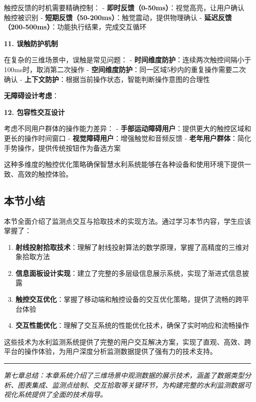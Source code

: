 触控反馈的时机需要精确控制： - \textbf{即时反馈（0-50ms）}：视觉高亮，让用户确认触控被识别 - \textbf{短期反馈（50-200ms）}：触觉震动，提供物理确认 - \textbf{延迟反馈（200-500ms）}：功能执行结果，完成交互循环

\textbf{11. 误触防护机制}

在复杂的三维场景中，误触是常见问题： - \textbf{时间维度防护}：连续两次触控间隔小于100ms时，取消第二次操作 - \textbf{空间维度防护}：同一区域5秒内的重复操作需要二次确认 - \textbf{上下文防护}：根据当前操作状态，智能判断操作意图的合理性

\textbf{无障碍设计考虑}：

\textbf{12. 包容性交互设计}

考虑不同用户群体的操作能力差异： - \textbf{手部运动障碍用户}：提供更大的触控区域和更长的操作时间窗口 - \textbf{视觉障碍用户}：增强触觉和音频反馈 - \textbf{老年用户群体}：简化手势操作，提供传统按钮作为备选方案

这种多维度的触控优化策略确保智慧水利系统能够在各种设备和使用环境下提供一致、高效的触控体验。

\subsection{本节小结}\label{ux672cux8282ux5c0fux7ed3-3}

本节全面介绍了监测点交互与拾取技术的实现方法。通过学习本节内容，学生应该掌握了：

\begin{enumerate}
\def\labelenumi{\arabic{enumi}.}
\tightlist
\item
  \textbf{射线投射拾取技术}：理解了射线投射算法的数学原理，掌握了高精度的三维对象拾取方法
\item
  \textbf{信息面板设计实现}：建立了完整的多层级信息展示系统，实现了渐进式信息披露
\item
  \textbf{触控交互优化}：掌握了移动端和触控设备的交互优化策略，提供了流畅的跨平台体验
\item
  \textbf{交互性能优化}：理解了交互系统的性能优化技术，确保了实时响应和流畅操作
\end{enumerate}

这些技术为水利监测系统提供了完整的用户交互解决方案，实现了直观、高效、跨平台的操作体验，为用户深度分析监测数据提供了强有力的技术支持。

\begin{center}\rule{0.5\linewidth}{0.5pt}\end{center}

\emph{第七章总结：本章系统介绍了三维场景中观测数据的展示技术，涵盖了数据类型分析、图表集成、监测点绘制、交互拾取等关键环节，为构建完整的水利监测数据可视化系统提供了全面的技术指导。}
